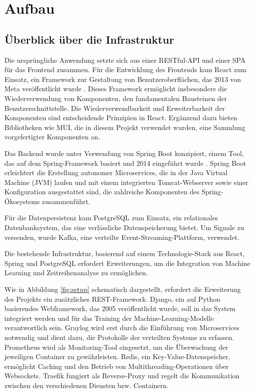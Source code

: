 
\chapter{Aufbau}
\label{cha:setup}
\section{Überblick über die Infrastruktur}
\label{sec:infrastruktur}
Die ursprüngliche Anwendung setzte sich aus einer RESTful-API und einer \acl{SPA} für das Frontend zusammen. 
Für die Entwicklung des Frontends kam React zum Einsatz, ein Framework zur Gestaltung von Benutzeroberflächen, das 2013 von Meta veröffentlicht wurde \cite*{TheHisto67:online}. 
Dieses Framework ermöglicht insbesondere die Wiederverwendung von Komponenten, den fundamentalen Bausteinen der Benutzerschnittstelle. Die Wiederverwendbarkeit und Erweiterbarkeit der 
Komponenten sind entscheidende Prinzipien in React. Ergänzend dazu bieten Bibliotheken wie \acl{MUI}, die in diesem Projekt verwendet wurden, eine Sammlung vorgefertigter Komponenten an.

Das Backend wurde unter Verwendung von Spring Boot konzipiert, einem Tool, das auf dem Spring-Framework basiert und 2014 eingeführt wurde \cite*{SpringBo22:online}. Spring Boot erleichtert die 
Erstellung autonomer Microservices, die in der Java Virtual Machine (JVM) laufen und mit einem integrierten Tomcat-Webserver sowie einer Konfiguration ausgestattet sind, 
die zahlreiche Komponenten des Spring-Ökosystems zusammenführt.

Für die Datenpersistenz kam PostgreSQL zum Einsatz, ein relationales Datenbanksystem, das eine verlässliche Datenspeicherung bietet. Um Signale zu versenden, wurde Kafka, eine verteilte Event-Streaming-Plattform, verwendet.

Die bestehende Infrastruktur, basierend auf einem Technologie-Stack aus React, Spring und PostgreSQL erfordert Erweiterungen, um die Integration von Machine Learning und Zeitreihenanalyse zu ermöglichen.

Wie in Abbildung \ref*{fig:setup} schematisch dargestellt, erfordert die Erweiterung des Projekts ein zusätzliches REST-Framework. Django, ein auf Python basierendes Webframework, 
das 2005 veröffentlicht wurde, soll in das System integriert werden und für das Training der Machine-Learning-Modelle verantwortlich sein.
Graylog wird erst durch die Einführung von Microservices notwendig und dient dazu, die Protokolle der verteilten Systeme zu erfassen.
Prometheus wird als Monitoring-Tool eingesetzt, um die Überwachung der jeweiligen Container zu gewährleisten.
Redis, ein Key-Value-Datenspeicher, ermöglicht Caching und den Betrieb von Multithreading-Operationen über Websockets.
Traefik fungiert als Reverse-Proxy und regelt die Kommunikation zwischen den verschiedenen Diensten bzw. Containern.

